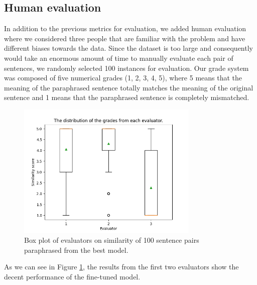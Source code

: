 \documentclass[fleqn,moreauthors,10pt]{ds_report}
\begin{document}


\subsection*{Human evaluation}
In addition to the previous metrics for evaluation, we added human evaluation where we considered three people that are familiar with the problem and have different biases towards the data. Since the dataset is too large and consequently would take an enormous amount of time to manually evaluate each pair of sentences, we randomly selected 100 instances for evaluation. Our grade system was composed of five numerical grades (1, 2, 3, 4, 5), where 5 means that the meaning of the paraphrased sentence totally matches the meaning of the original sentence and 1 means that the paraphrased sentence is completely mismatched.

\begin{figure}[!hbt]
    \centering
    \includegraphics[width=\linewidth, height=6.5cm]{fig/fig.png}
    \caption{Box plot of evaluators on similarity of 100 sentence pairs paraphrased from the best model.}
    \label{fig:eval_res}
\end{figure}
As we can see in Figure \ref{fig:eval_res}, the results from the first two evaluators show the decent performance of the fine-tuned model.
\end{document}
